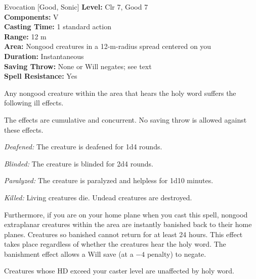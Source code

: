 {Evocation [Good, Sonic]}
{
	\textbf{Level:}
	Clr 7, Good 7\\
	\textbf{Components:}
	V\\
	\textbf{Casting Time:}
	1 standard action\\
	\textbf{Range:}
	12 m\\
	\textbf{Area:}
	Nongood creatures in a 12-m-radius spread centered on you\\
	\textbf{Duration:}
	Instantaneous\\
	\textbf{Saving Throw:}
	None or Will negates; see text\\
	\textbf{Spell Resistance:}
	Yes\\
}
{
	Any nongood creature within the area that hears the holy word suffers the following ill effects.


	The effects are cumulative and concurrent. No saving throw is allowed against these effects.

	\textit{Deafened:}
	The creature is deafened for 1d4 rounds.

	\textit{Blinded:}
	The creature is blinded for 2d4 rounds.

	\textit{Paralyzed:}
	The creature is paralyzed and helpless for 1d10 minutes.

	\textit{Killed:}
	Living creatures die. Undead creatures are destroyed.

	Furthermore, if you are on your home plane when you cast this spell, nongood extraplanar creatures within the area are instantly banished back to their home planes. Creatures so banished cannot return for at least 24 hours. This effect takes place regardless of whether the creatures hear the holy word. The banishment effect allows a Will save (at a $-4$ penalty) to negate.

	Creatures whose HD exceed your caster level are unaffected by holy word.

}
